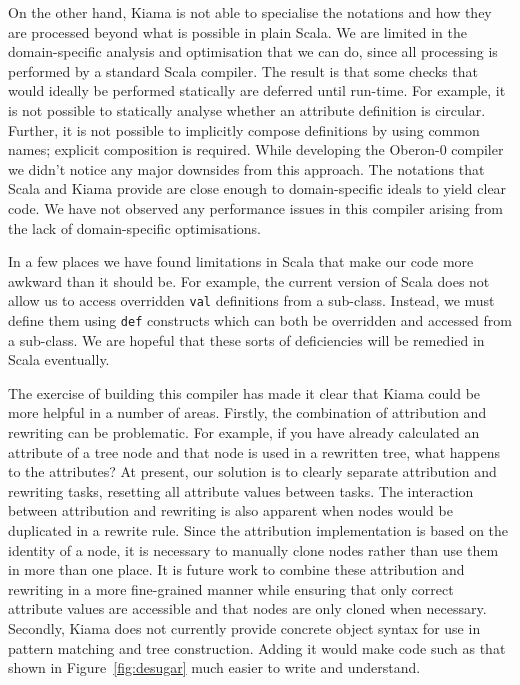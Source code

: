 On the other hand, Kiama is not able to specialise the notations and how they are processed beyond what is possible in plain Scala.
We are limited in the domain-specific analysis and optimisation that we can do, since all processing is performed by a standard Scala compiler.
The result is that some checks that would ideally be performed statically are deferred until run-time.
For example, it is not possible to statically analyse whether an attribute definition is circular.
Further, it is not possible to implicitly compose definitions by using common names; explicit composition is required.
While developing the Oberon-0 compiler we didn't notice any major downsides from this approach.
The notations that Scala and Kiama provide are close enough to domain-specific ideals to yield clear code.
We have not observed any performance issues in this compiler arising from the lack of domain-specific optimisations.

In a few places we have found limitations in Scala that make our code more awkward than it should be.
For example, the current version of Scala does not allow us to access overridden \verb|val| definitions from a sub-class.
Instead, we must define them using \verb|def| constructs which can both be overridden and accessed from a sub-class.
We are hopeful that these sorts of deficiencies will be remedied in Scala eventually.

The exercise of building this compiler has made it clear that Kiama could be more helpful in a number of areas.
Firstly, the combination of attribution and rewriting can be problematic.
For example, if you have already calculated an attribute of a tree node and that node is used in a rewritten tree, what happens to the attributes?
At present, our solution is to clearly separate attribution and rewriting tasks, resetting all attribute values between tasks.
The interaction between attribution and rewriting is also apparent when nodes would be duplicated in a rewrite rule.
Since the attribution implementation is based on the identity of a node, it is necessary to manually clone nodes rather than use them in more than one place.
It is future work to combine these attribution and rewriting in a more fine-grained manner while ensuring that only correct attribute values are accessible and that nodes are only cloned when necessary.
Secondly, Kiama does not currently provide concrete object syntax for use in pattern matching and tree construction.
Adding it would make code such as that shown in Figure~\ref{fig:desugar} much easier to write and understand.
